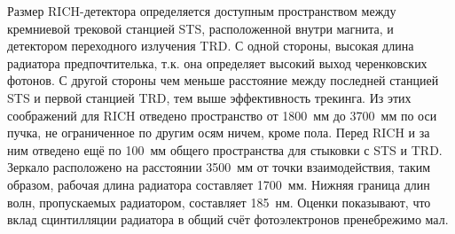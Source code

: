 Размер RICH-детектора определяется доступным пространством между кремниевой трековой станцией STS, расположенной внутри магнита, и детектором переходного излучения TRD. С одной стороны, высокая длина радиатора предпочтителька, т.к. она определяет высокий выход черенковских фотонов. С другой стороны чем меньше расстояние между последней станцией STS и первой станцией TRD, тем выше эффективность трекинга. Из этих соображений для RICH отведено пространство от 1800~мм до 3700~мм по оси пучка, не ограниченное по другим осям ничем, кроме пола. Перед RICH и за ним отведено ещё по 100~мм общего пространства для стыковки с STS и TRD. Зеркало расположено на расстоянии 3500~мм от точки взаимодействия, таким образом, рабочая длина радиатора составляет 1700~мм.
Нижняя граница длин волн, пропускаемых радиатором, составляет 185~нм. Оценки показывают, что вклад сцинтилляции радиатора в общий счёт фотоэлектронов пренебрежимо мал.





